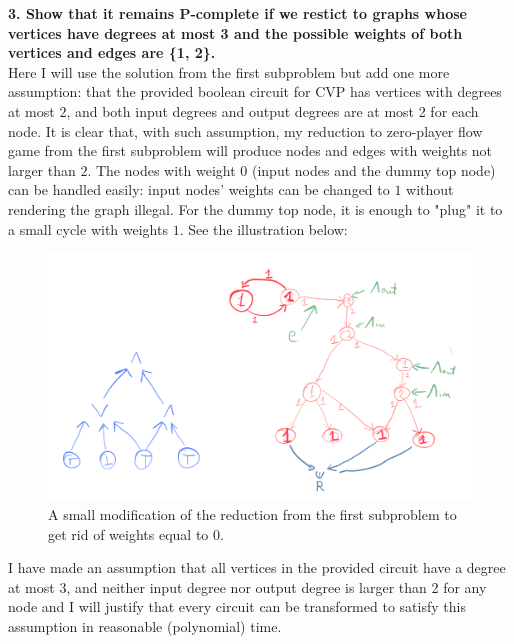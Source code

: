 \noindent
\textbf{
      3. Show that it remains P-complete if we restict to graphs whose vertices have
      degrees at most 3 and the possible weights of both vertices and edges are
      \{1, 2\}.
}\\
Here I will use the solution from the first subproblem but add one more assumption: that the provided
boolean circuit for CVP has vertices with degrees at most $2$, and both input degrees and output degrees
are at most 2 for each node.
It is clear that, with such assumption, my reduction to zero-player flow game from the first subproblem
will produce nodes and edges with weights not larger than $2$. The nodes with weight $0$ (input nodes
and the dummy top node) can be handled easily: input nodes' weights can be changed to $1$ without rendering
the graph illegal. For the dummy top node, it is enough to "plug" it to a small cycle with weights $1$.
See the illustration below:
\begin{figure}[H]
      \centering
      \caption{A small modification of the reduction from the first subproblem to get rid of weights equal to $0$.}
      \includegraphics[scale=0.2]{content/graphics/game16.png}
\end{figure}
I have made an assumption that all vertices in the provided circuit have a degree at most 3, and neither input degree
nor output degree is larger than 2 for any node and I will justify that every circuit can be transformed to satisfy this
assumption in reasonable (polynomial) time.

